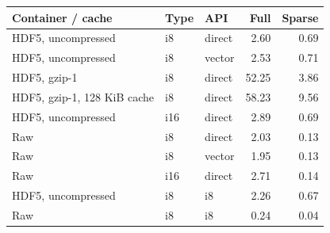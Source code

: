 \begin{tabularx}{\linewidth}{@{}Xllrr@{}}\toprule
Container / cache & Type & API & Full & Sparse\\\midrule
HDF5, uncompressed & i8 & direct & 2.60 & 0.69 \\
HDF5, uncompressed & i8 & vector & 2.53 & 0.71 \\
HDF5, gzip-1 & i8 & direct & 52.25 & 3.86 \\
HDF5, gzip-1, 128 KiB cache & i8 & direct & 58.23 & 9.56 \\
HDF5, uncompressed & i16 & direct & 2.89 & 0.69 \\
Raw & i8 & direct & 2.03 & 0.13 \\
Raw & i8 & vector & 1.95 & 0.13 \\
Raw & i16 & direct & 2.71 & 0.14 \\
HDF5, uncompressed & i8 & i8 & 2.26 & 0.67 \\
Raw & i8 & i8 & 0.24 & 0.04 \\
\bottomrule
\end{tabularx}
